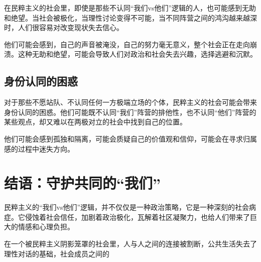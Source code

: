 在民粹主义的社会里，即使是那些不认同“我们vs他们”逻辑的人，也可能感到无助和绝望。当社会被极化，当理性讨论变得不可能，当不同阵营之间的鸿沟越来越深时，人们很容易对改变现状失去信心。

他们可能会感到，自己的声音被淹没，自己的努力毫无意义，整个社会正在走向崩溃。这种无助和绝望，可能会导致人们对政治和社会失去兴趣，选择逃避和沉默。

\subsection{身份认同的困惑}

对于那些不愿站队、不认同任何一方极端立场的个体，民粹主义的社会可能会带来身份认同的困惑。他们可能既不认同“我们”阵营的排他性，也不认同“他们”阵营的某些观点，却又难以在两极对立的社会中找到自己的位置。

他们可能会感到孤独和隔离，可能会质疑自己的价值观和信仰，可能会在寻求归属感的过程中迷失方向。

\section{结语：守护共同的“我们”}

民粹主义的“我们vs他们”逻辑，并不仅仅是一种政治策略，它是一种深刻的社会病症。它侵蚀着社会信任，加剧着政治极化，瓦解着社区凝聚力，也给人们带来了巨大的情感和心理负担。

在一个被民粹主义阴影笼罩的社会里，人与人之间的连接被割断，公共生活失去了理性对话的基础，社会成员之间的
